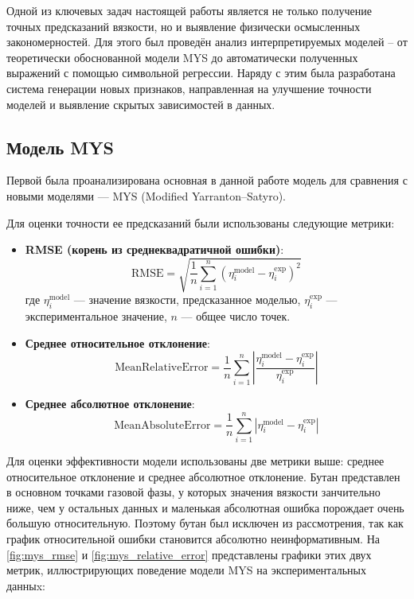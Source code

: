 \documentclass[a4paper,12pt]{article}
\begin{document}
  Одной из ключевых задач настоящей работы является не только получение точных предсказаний вязкости, но и выявление физически осмысленных закономерностей. Для этого был проведён анализ интерпретируемых моделей -- от теоретически обоснованной модели MYS до автоматически полученных выражений с помощью символьной регрессии. Наряду с этим была разработана система генерации новых признаков, направленная на улучшение точности моделей и выявление скрытых зависимостей в данных.

  \subsection{Модель MYS}

    Первой была проанализирована основная в данной работе модель для сравнения с новыми моделями — MYS (Modified Yarranton–Satyro).
    
    Для оценки точности ее предсказаний были использованы следующие метрики:
    
    \begin{itemize}
      \item \textbf{RMSE (корень из среднеквадратичной ошибки)}:
      \begin{equation}
        \mathrm{RMSE} = \sqrt{\frac{1}{n} \sum_{i=1}^{n} \left( \eta_i^{\text{model}} - \eta_i^{\text{exp}} \right)^2}
      \end{equation}
      где \( \eta_i^{\text{model}} \) — значение вязкости, предсказанное моделью, \( \eta_i^{\text{exp}} \) — экспериментальное значение, \( n \) — общее число точек.
    
      \item \textbf{Среднее относительное отклонение}:
      \begin{equation}
        \mathrm{MeanRelativeError} = \frac{1}{n} \sum_{i=1}^{n} \left| \frac{\eta_i^{\text{model}} - \eta_i^{\text{exp}}}{\eta_i^{\text{exp}}} \right|
      \end{equation}

      \item \textbf{Среднее абсолютное отклонение}:
      \begin{equation}
        \mathrm{MeanAbsoluteError} = \frac{1}{n} \sum_{i=1}^{n} \left| \eta_i^{\text{model}} - \eta_i^{\text{exp}} \right|
      \end{equation}
    \end{itemize}
    
    \medskip
    
   Для оценки эффективности модели использованы две метрики выше: среднее относительное отклонение и среднее абсолютное отклонение. Бутан представлен в основном точками газовой фазы, у которых значения вязкости занчительно ниже, чем у остальных данных и маленькая абсолютная ошибка порождает очень большую относительную. Поэтому бутан был исключен из рассмотрения, так как график относительной ошибки становится абсолютно неинформативным. На \autoref{fig:mys_rmse} и \autoref{fig:mys_relative_error} представлены графики этих двух метрик, иллюстрирующих поведение модели MYS на экспериментальных данныx:  
\end{document}

